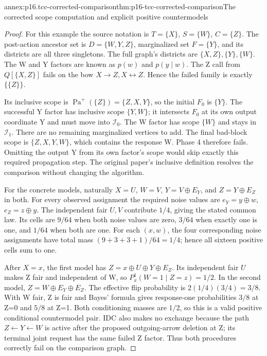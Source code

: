 \begin{annexitem}{annex:p16.tcc-corrected-comparison}{thm:p16-tcc-corrected-comparison}{The corrected scope computation and explicit positive countermodels}
\begin{proof}
For this example the source notation is \(T=\{X\}\),
\(S=\{W\}\), \(C=\{Z\}\). The post-action ancestor
set is \(D=\{W,Y,Z\}\), marginalized set \(F=\{Y\}\),
and its districts are all three singletons. The full graph's
districts are \(\{X,Z\},\{Y\},\{W\}\).
The W and Y factors are known as \(p(w)\) and \(p(y\mid w)\).
The Z call from \(Q[\{X,Z\}]\) fails on the bow
\(X\to Z,X\leftrightarrow Z\). Hence the failed family
is exactly \(\{\{Z\}\}\).

Its inclusive scope is \(\operatorname{Pa}^{+}(\{Z\})=\{Z,X,Y\}\),
so the initial \(F_0\) is \(\{Y\}\). The successful
Y factor has inclusive scope \(\{Y,W\}\); it intersects
\(F_0\) at its own output coordinate Y and must move into
\(\mathcal I_0\). The W factor has scope \(\{W\}\)
and stays in \(\mathcal I_1\). There are no remaining
marginalized vertices to add. The final bad-block scope is
\(\{Z,X,Y,W\}\), which contains the response W. Phase 4
therefore fails. Omitting the output Y from its own factor's
scope would skip exactly this required propagation step. The
original paper's inclusive definition resolves the comparison
without changing the algorithm.

For the concrete models, naturally \(X=U\), \(W=V\),
\(Y=V\oplus E_Y\), and \(Z=Y\oplus E_Z\) in both.
For every observed assignment the required noise values are
\(e_Y=y\oplus w\), \(e_Z=z\oplus y\). The independent
fair \(U,V\) contribute \(1/4\), giving the stated common
law. Its cells are \(9/64\) when both noise values are zero,
\(3/64\) when exactly one is one, and \(1/64\) when both
are one. For each \((x,w)\), the four corresponding noise
assignments have total mass \((9+3+3+1)/64=1/4\); hence
all sixteen positive cells sum to one.

After \(X=x\), the first model has
\(Z=x\oplus U\oplus Y\oplus E_Z\). Its independent
fair \(U\) makes Z fair and independent of W, so
\(P^1_x(W=1\mid Z=z)=1/2\). In the second model,
\(Z=W\oplus E_Y\oplus E_Z\). The effective flip
probability is \(2(1/4)(3/4)=3/8\). With W fair,
Z is fair and Bayes' formula gives response-one probabilities
\(3/8\) at Z=0 and \(5/8\) at Z=1. Both conditioning
masses are \(1/2\), so this is a valid positive conditional
countermodel pair. IDC also makes no exchange because the
path \(Z\leftarrow Y\leftarrow W\) is active after
the proposed outgoing-arrow deletion at Z; its terminal joint
request has the same failed Z factor. Thus both procedures
correctly fail on the comparison graph.
\end{proof}
\end{annexitem}
